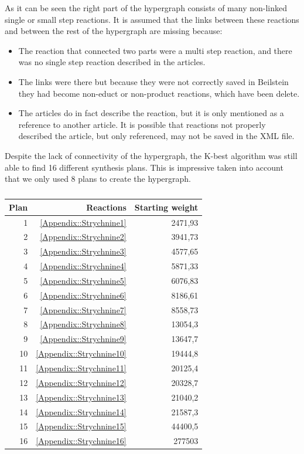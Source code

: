 \documentclass[a4paper,10pt,titlepage]{paper}
\begin{document}
As it can be seen the right part of the hypergraph consists of many non-linked single or small step reactions. It is assumed that the links between these reactions and between the rest of the hypergraph are missing because:
\begin{itemize}
\item
The reaction that connected two parts were a multi step reaction, and there was no single step reaction described in the articles.
\item
The links were there but because they were not correctly saved in Beilstein they had become non-educt or non-product reactions, which have been delete.
\item
The articles do in fact describe the reaction, but it is only mentioned as a reference to another article. It is possible that reactions not properly described the article, but only referenced, may not be saved in the XML file.
\end{itemize}
Despite the lack of connectivity of the hypergraph, the K-best algorithm was still able to find 16 different synthesis plans. This is impressive taken into account that we only used 8 plans to create the hypergraph.
\begin{table}[H]
\centering
\begin{tabular}{|r|r|r|}
\hline
Plan & Reactions & Starting weight \\ \hline
1 & \ref{Appendix::Strychnine1} & 2471,93 \\\hline
2 & \ref{Appendix::Strychnine2} & 3941,73 \\\hline
3 & \ref{Appendix::Strychnine3} & 4577,65 \\\hline
4 & \ref{Appendix::Strychnine4} & 5871,33 \\\hline
5 & \ref{Appendix::Strychnine5} & 6076,83 \\\hline
6 & \ref{Appendix::Strychnine6} & 8186,61 \\\hline
7 & \ref{Appendix::Strychnine7} & 8558,73 \\\hline
8 & \ref{Appendix::Strychnine8} & 13054,3 \\\hline
9 & \ref{Appendix::Strychnine9} & 13647,7 \\\hline
10 & \ref{Appendix::Strychnine10} & 19444,8 \\\hline
11 & \ref{Appendix::Strychnine11} & 20125,4 \\\hline
12 & \ref{Appendix::Strychnine12} & 20328,7 \\\hline
13 & \ref{Appendix::Strychnine13} & 21040,2 \\\hline
14 & \ref{Appendix::Strychnine14} & 21587,3 \\\hline
15 & \ref{Appendix::Strychnine15} & 44400,5 \\\hline
16 & \ref{Appendix::Strychnine16} & 277503 \\\hline
\end{tabular}
\caption{}
\label{tab::StrychnineResults}
\end{table}
\end{document}
